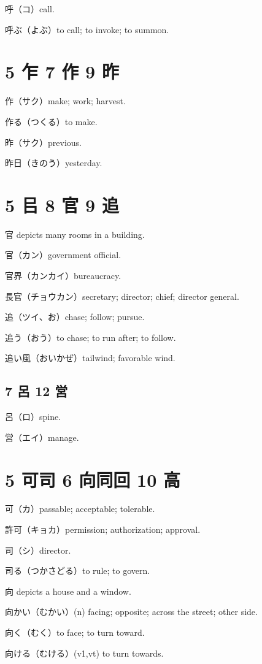 呼（コ）call.

呼ぶ（よぶ）to call; to invoke; to summon.

\section{5 乍 7 作 9 昨}

作（サク）make; work; harvest.

作る（つくる）to make.

昨（サク）previous.

昨日（きのう）yesterday.

\section{5 㠯 8 官 9 追}

官 depicts many rooms in a building.

官（カン）government official.

官界（カンカイ）bureaucracy.

長官（チョウカン）secretary; director; chief; director general.

追（ツイ、お）chase; follow; pursue.

追う（おう）to chase; to run after; to follow.

追い風（おいかぜ）tailwind; favorable wind.

\subsection{7 呂 12 営}

呂（ロ）spine.

営（エイ）manage.

\section{5 可司 6 向同回 10 高}

可（カ）passable; acceptable; tolerable.

許可（キョカ）permission; authorization; approval.

司（シ）director.

司る（つかさどる）to rule; to govern.

向 depicts a house and a window.

向かい（むかい）(n) facing; opposite; across the street; other side.

向く（むく）to face; to turn toward.

向ける（むける）(v1,vt) to turn towards.

